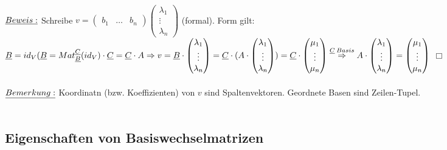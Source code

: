 \documentclass[fleqn, a4paper, 11pt]{article}
\begin{document}
\\
$\uline{Beweis:}$ Schreibe $v=\begin{pmatrix}
	b_1 & \dots & b_n
\end{pmatrix}\begin{pmatrix}
	\lambda_1\\
	\vdots\\
	\lambda_n
\end{pmatrix}$ (formal). Form gilt: $\uline{B}=id_V(\uline{B}=Mat_{\uline{B}}^{\uline{C}}(id_V)\cdot\uline{C}=\uline{C}\cdot A\Rightarrow v=\uline{B}\cdot\begin{pmatrix}
	\lambda_1\\
	\vdots\\
	\lambda_n
\end{pmatrix}=\uline{C}\cdot(A\cdot\begin{pmatrix}
	\lambda_1\\
	\vdots\\
	\lambda_n
\end{pmatrix})=\uline{C}\cdot\begin{pmatrix}
	\mu_1\\
	\vdots\\
	\mu_n
\end{pmatrix}\stackrel{\uline{C}\:Basis}{\Rightarrow} A\cdot\begin{pmatrix}
	\lambda_1\\
	\vdots\\
	\lambda_n
\end{pmatrix}=\begin{pmatrix}
	\mu_1\\
	\vdots\\
	\mu_n
\end{pmatrix}$ \hfill $\Box$\\
\\
$\uline{Bemerkung:}$ Koordinatn (bzw. Koeffizienten) von $v$ sind Spaltenvektoren. Geordnete Basen sind \dq Zeilen-Tupel\dq.\\
\\
\subsection{Eigenschaften von Basiswechselmatrizen}
\end{document}

